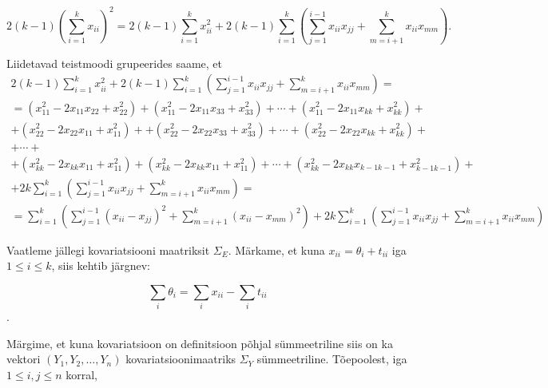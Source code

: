 \documentclass[a4paper,12pt]{article}
\numberwithin{equation}{section}
\theoremstyle{definition}
\begin{document}
\begin{equation*}
2 \left( k-1 \right) \left( \sum \limits_{i=1}^k x_{ii} \right)^2 =  2 \left( k-1 \right) \sum \limits_{i=1}^k x_{ii}^2  + 2 \left( k-1 \right) \sum \limits_{i=1}^k  \left( \sum \limits_{j=1}^{i-1} x_{ii} x_{jj} + \sum \limits_{m=i+1}^k {x_{ii}}{x_{mm}} \right) \text{.}
\end{equation*}

Liidetavad teistmoodi grupeerides saame, et
\begin{equation*}
\begin{gathered}
2 \left( k-1 \right) \sum \limits_{i=1}^k x_{ii}^2  + 2 \left( k-1 \right) \sum \limits_{i=1}^k  \left( \sum \limits_{j=1}^{i-1} x_{ii} x_{jj} + \sum \limits_{m=i+1}^k {x_{ii}}{x_{mm}} \right) = \\
= \left( x_{11}^2 - 2 x_{11} x_{22} + x_{22}^2 \right) + \left( x_{11}^2 - 2 x_{11} x_{33} + x_{33}^2 \right) + \cdots +\left( x_{11}^2 - 2 x_{11} x_{kk} + x_{kk}^2 \right) + \\
+ \left( x_{22}^2 - 2 x_{22} x_{11} + x_{11}^2 \right) + 
 +  \left( x_{22}^2 - 2 x_{22} x_{33} + x_{33}^2 \right) + \cdots + \left( x_{22}^2 - 2 x_{22} x_{kk} + x_{kk}^2 \right) + \\
 + \cdots + \\
 + \left( x_{kk}^2 - 2 x_{kk} x_{11} + x_{11}^2 \right) + \left( x_{kk}^2 - 2 x_{kk} x_{11} + x_{11}^2 \right) + \cdots + \left( x_{kk}^2 - 2 x_{kk} x_{k-1 k-1} + x_{k-1 k-1}^2 \right) + \\
 + 2 k \sum \limits_{i=1}^k  \left( \sum \limits_{j=1}^{i-1} x_{ii} x_{jj} + \sum \limits_{m=i+1}^k {x_{ii}}{x_{mm}} \right) =\\
= \sum \limits_{i=1}^k  \left( \sum \limits_{j=1}^{i-1} (x_{ii} - x_{jj})^2 + \sum \limits_{m=i+1}^k ({x_{ii}} - {x_{mm}})^2 \right) +  2 k \sum \limits_{i=1}^k  \left( \sum \limits_{j=1}^{i-1} x_{ii} x_{jj} + \sum \limits_{m=i+1}^k {x_{ii}}{x_{mm}} \right)
\end{gathered}
\end{equation*}

Vaatleme jällegi kovariatsiooni maatriksit $\Sigma_E$. Märkame, et kuna $x_{ii} = \theta_i + t_{ii}$ iga $ 1 \leq i \leq k$, siis kehtib järgnev:

\begin{equation*}
 \sum_i \theta_i = \sum_i x_{ii} - \sum_i t_{ii} 
\end{equation*}.

Märgime, et kuna kovariatsioon on definitsioon põhjal sümmeetriline siis on ka vektori $(Y_1,Y_2,\ldots,Y_n)$ kovariatsioonimaatriks $\Sigma_Y$ sümmeetriline. Tõepoolest, iga $1 \leq i,j \leq n$ korral,  
\end{document}

